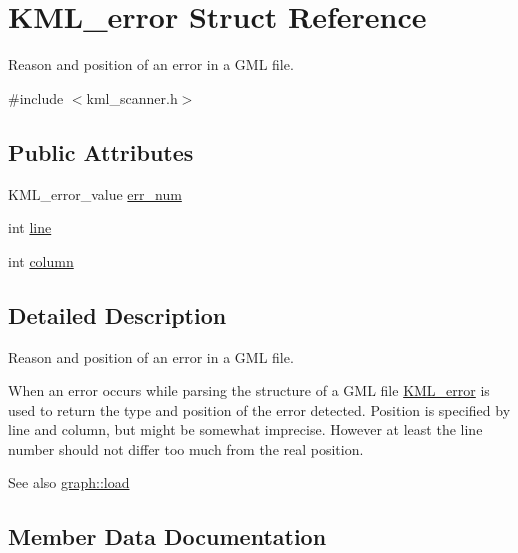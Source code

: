 \hypertarget{struct_k_m_l__error}{}\section{K\+M\+L\+\_\+error Struct Reference}
\label{struct_k_m_l__error}


Reason and position of an error in a G\+ML file.  




{\ttfamily \#include $<$kml\+\_\+scanner.\+h$>$}

\subsection*{Public Attributes}
\begin{DoxyCompactItemize}
\item 
K\+M\+L\+\_\+error\+\_\+value \mbox{\hyperlink{struct_k_m_l__error_af529c360a62a01e2db8ed6b4a9ee0bf2}{err\+\_\+num}}
\item 
int \mbox{\hyperlink{struct_k_m_l__error_a2598fe26a2482414d4305d3fbcb17929}{line}}
\item 
int \mbox{\hyperlink{struct_k_m_l__error_a8c04fdee854b2dd5e3266776fb6d596f}{column}}
\end{DoxyCompactItemize}


\subsection{Detailed Description}
Reason and position of an error in a G\+ML file. 

When an error occurs while parsing the structure of a G\+ML file {\ttfamily \mbox{\hyperlink{struct_k_m_l__error}{K\+M\+L\+\_\+error}}} is used to return the type and position of the error detected. Position is specified by {\ttfamily line} and {\ttfamily column}, but might be somewhat imprecise. However at least the line number should not differ too much from the real position.

\begin{DoxySeeAlso}{See also}
\mbox{\hyperlink{classgraph_a35749ff66d1acd6bbef9852df4f39c95}{graph\+::load}} 
\end{DoxySeeAlso}


\subsection{Member Data Documentation}
\mbox{\label{struct_k_m_l__error_a8c04fdee854b2dd5e3266776fb6d596f}} 
